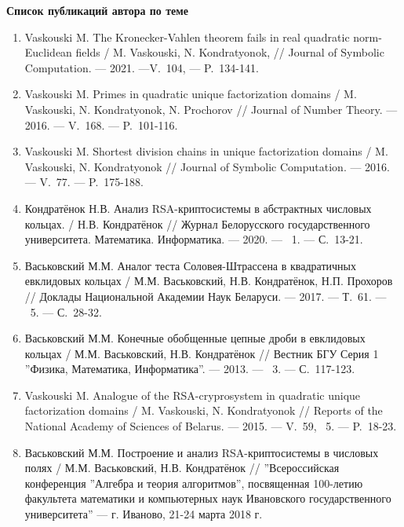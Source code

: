 \begin{center}
\textbf{Список публикаций автора по теме}
\end{center}

\begin{enumerate}[label=\arabic*--A., ref=\arabic*--A]
    \item \label{source:JSC_2021}
    Vaskouski M. The Kronecker-Vahlen theorem fails in real quadratic norm-Euclidean fields / M. Vaskouski, N. Kondratyonok, // Journal of Symbolic Computation. --- 2021. ---V.~104, --- P.~134-141.

    \item \label{source:JNT_2016}
    Vaskouski M. Primes in quadratic unique factorization domains / M. Vaskouski, N. Kondratyonok, N. Prochorov // Journal of Number Theory. --- 2016. --- V.~168. --- P.~101-116.
    
    \item \label{source:JSC_2016}
    Vaskouski M. Shortest division chains in unique factorization domains / M. Vaskouski, N. Kondratyonok // Journal of Symbolic Computation. --- 2016. --- V.~77. --- P.~175-188.

    \item \label{source:BSU_Journal_2020}
    Кондратёнок Н.В. Анализ RSA-криптосистемы в абстрактных числовых кольцах. / Н.В. Кондратёнок // Журнал Белорусского государственного университета. Математика. Информатика. --- 2020. --- \textnumero~1. --- С.~13-21.

    \item \label{source:RNANB_2017}
    Васьковский М.М. Аналог теста Соловея-Штрассена в квадратичных евклидовых кольцах / М.М. Васьковский, Н.В. Кондратёнок, Н.П. Прохоров // Доклады Национальной Академии Наук Беларуси. --- 2017. --- Т.~61. --- \textnumero~5. --- С.~28-32.

    \item \label{source:Vestnik_2013}
    Васьковский М.М. Конечные обобщенные цепные дроби в евклидовых кольцах / М.М. Васьковский, Н.В. Кондратёнок // Вестник БГУ Серия 1 ''Физика, Математика, Информатика''. --- 2013. --- \textnumero~3. --- С.~117-123.

    \item \label{source:RNANB_2015}
    Vaskouski M. Analogue of the RSA-cryprosystem in quadratic unique factorization domains / M. Vaskouski, N. Kondratyonok // Reports of the National Academy of Sciences of Belarus. --- 2015. --- V.~59, \textnumero~5. --- P.~18-23.

    \item \label{source:Ivanovo}
    Васьковский М.М. Построение и анализ RSA-криптосистемы в числовых полях / М.М. Васьковский, Н.В. Кондратёнок // ''Всероссийская конференция ''Алгебра и теория алгоритмов'', посвященная 100-летию факультета математики и компьютерных наук Ивановского государственного университета'' --- г. Иваново, 21-24 марта 2018 г.


\end{enumerate}
